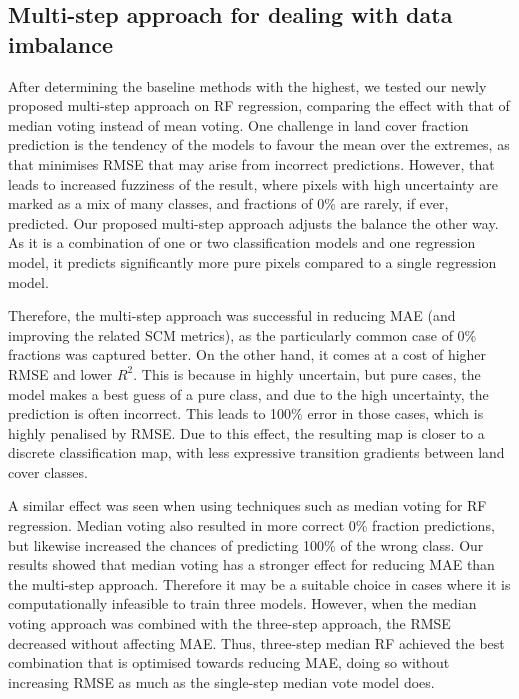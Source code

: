 \documentclass[review,authoryear,3p]{elsarticle}
\begin{document}
\subsection{Multi-step approach for dealing with data imbalance}

After determining the baseline methods with the highest, we tested our newly proposed multi-step approach on \gls{RF} regression, comparing the effect with that of median voting instead of mean voting.
One challenge in land cover fraction prediction is the tendency of the models to favour the mean over the extremes, as that minimises \gls{RMSE} that may arise from incorrect predictions.
However, that leads to increased fuzziness of the result, where pixels with high uncertainty are marked as a mix of many classes, and fractions of 0\% are rarely, if ever, predicted.
Our proposed multi-step approach adjusts the balance the other way.
As it is a combination of one or two classification models and one regression model, it predicts significantly more pure pixels compared to a single regression model.

Therefore, the multi-step approach was successful in reducing \gls{MAE} (and improving the related \gls{SCM} metrics), as the particularly common case of 0\% fractions was captured better.
On the other hand, it comes at a cost of higher \gls{RMSE} and lower $R^2$.
This is because in highly uncertain, but pure cases, the model makes a best guess of a pure class, and due to the high uncertainty, the prediction is often incorrect.
This leads to 100\% error in those cases, which is highly penalised by \gls{RMSE}.
Due to this effect, the resulting map is closer to a discrete classification map, with less expressive transition gradients between land cover classes.

A similar effect was seen when using techniques such as median voting for \gls{RF} regression.
Median voting also resulted in more correct 0\% fraction predictions, but likewise increased the chances of predicting 100\% of the wrong class.
Our results showed that median voting has a stronger effect for reducing \gls{MAE} than the multi-step approach.
Therefore it may be a suitable choice in cases where it is computationally infeasible to train three models.
However, when the median voting approach was combined with the three-step approach, the \gls{RMSE} decreased without affecting \gls{MAE}.
Thus, three-step median \gls{RF} achieved the best combination that is optimised towards reducing \gls{MAE}, doing so without increasing \gls{RMSE} as much as the single-step median vote model does.
\end{document}
